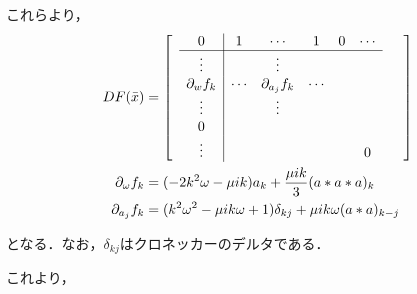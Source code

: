 \documentclass[11pt,a4paper]{jsarticle}
\theoremstyle{definition}
\begin{document}
これらより，
\begin{equation*}
  \begin{split}
    DF(\bar{x}) &=
    \begin{bmatrix}
       & \multicolumn{1}{c|}{0} & 1  & \cdots & 1 & 0 & \cdots & \\ \cline{2-7}
       & \multicolumn{1}{c|}{\vdots} & & \vdots & & & & \\
       & \multicolumn{1}{c|}{\partial_w f_k} & \cdots & \partial_{a_j}f_k & \cdots & & & \\
       & \multicolumn{1}{c|}{\vdots} & & \vdots & & & & \\
       & \multicolumn{1}{c|}{0} & & & & & &  & \\
       & \multicolumn{1}{c|}{\vdots} & & & & & 0 &
    \end{bmatrix}\\
    \partial_\omega f_k &= (-2k^2\omega-\mu ik)a_k + \frac{\mu ik}{3} (a*a*a)_k \\
    \partial_{a_j} f_k &= (k^2\omega^2-\mu ik\omega +1)\delta_{kj} + \mu ik \omega (a*a)_{k-j}
  \end{split}
\end{equation*}

となる．なお，$\delta_{kj}$はクロネッカーのデルタである．

これより，
\end{document}
